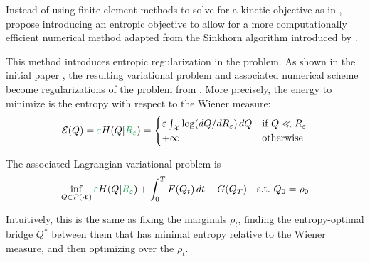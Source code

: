 \documentclass[../report.tex]{subfiles}
\begin{document}
Instead of using finite element methods to solve for a kinetic objective as in \cite{benamou:hal-01295299}, \textcite{benamou2018entropy} propose introducing an entropic objective to allow for a more computationally efficient numerical method adapted from the Sinkhorn algorithm introduced by \textcite{cuturi2013sinkhorn}.

This method introduces entropic regularization in the problem. As shown in the initial paper \cite{benamou2018entropy}, the resulting variational problem and associated numerical scheme become regularizations of the problem from \cite{benamou:hal-01295299,benamou2015lagrangian}.
More precisely, the energy to minimize is the entropy with respect to the Wiener measure:
\begin{equation}
	\mathcal{E}(Q) = {\greenfont \epsilon} H(Q | {\greenfont R_\epsilon}) =
	\begin{cases}
	\epsilon \int_\calX \log(dQ/dR_\epsilon)\, dQ
	& \mbox{if } Q \ll R_\epsilon  \\
	+\infty & \mbox{otherwise}
	\end{cases}
\end{equation}

The associated Lagrangian variational problem is
\begin{equation}\label{eq:EntropyLagrangianProblem}
	\inf_{Q\in\calP(\calX)}
	{\greenfont\epsilon} H(Q|{\greenfont R_{\epsilon}}) + \int_0^T F(Q_t)\,dt + G(Q_T)\quad
	\suchthat\ Q_0 = \rho_0
\end{equation}

Intuitively, this is the same as fixing the marginals $\rho_t$, finding the entropy-optimal bridge $Q^*$ between them that has minimal entropy relative to the Wiener measure, and then optimizing over the $\rho_t$.
\end{document}
